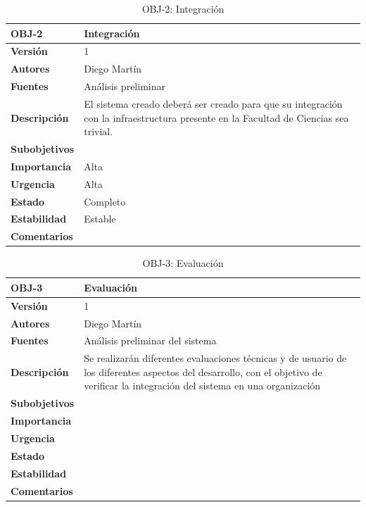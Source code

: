 \begin{table}[H]
\begin{tabular}{|p{2.5cm}|p{10cm}|}
\hline
\textbf{OBJ-2} &Integración\\
\hline
\textbf{Versión} &1\\
\hline
\textbf{Autores} &Diego Martín\\
\hline
\textbf{Fuentes} &Análisis preliminar\\
\hline
\textbf{Descripción} &El sistema creado deberá ser creado para que su integración con la infraestructura presente en la Facultad de Ciencias sea trivial.\\
\hline
\textbf{Subobjetivos} &\\
\hline
\textbf{Importancia} &Alta\\
\hline
\textbf{Urgencia} &Alta\\
\hline
\textbf{Estado} &Completo\\
\hline
\textbf{Estabilidad} &Estable\\
\hline
\textbf{Comentarios} &\\
\hline
\end{tabular}
\caption{OBJ-2: Integración}
\end{table}

\begin{table}[H]
\begin{tabular}{|p{2.5cm}|p{10cm}|}
\hline
\textbf{OBJ-3} &Evaluación\\
\hline
\textbf{Versión} &1\\
\hline
\textbf{Autores} &Diego Martín\\
\hline
\textbf{Fuentes} &Análisis preliminar del sistema\\
\hline
\textbf{Descripción} &Se realizarán diferentes evaluaciones técnicas y de usuario de los diferentes aspectos del desarrollo, con el objetivo de verificar la integración del sistema en una organización\\
\hline
\textbf{Subobjetivos} &\\
\hline
\textbf{Importancia} &\\
\hline
\textbf{Urgencia} &\\
\hline
\textbf{Estado} &\\
\hline
\textbf{Estabilidad} &\\
\hline
\textbf{Comentarios} &\\
\hline
\end{tabular}
\caption{OBJ-3: Evaluación}
\end{table}

